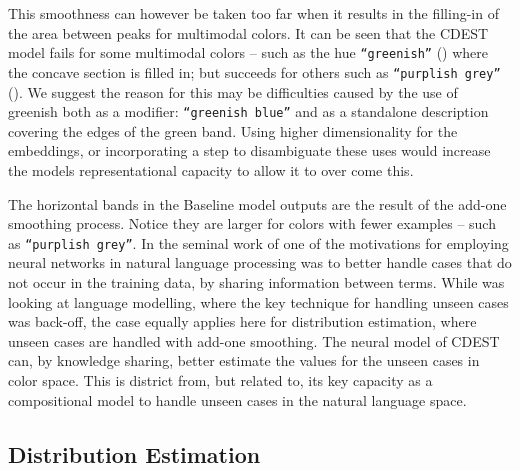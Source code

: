\documentclass[11pt,letterpaper, twocolumn]{article}
\newcommand{\textcite}{\cite}
\begin{document}
This smoothness can however be taken too far when it results in the filling-in of the area between peaks for multimodal colors.
It can be seen that the CDEST model fails for some multimodal colors -- such as the hue \texttt{``greenish''} () where the concave section is filled in;
but succeeds for others such as \texttt{``purplish grey''} ().
We suggest the reason for this may be difficulties caused by the use of greenish both as a modifier: \texttt{``greenish blue''} and as a standalone description covering the edges of the green band.
Using higher dimensionality for the embeddings, or incorporating a step to disambiguate these uses would increase the models representational capacity to allow it to over come this.


The horizontal bands in the Baseline model outputs are the result of the add-one smoothing process.
Notice they are larger for colors with fewer examples -- such as \texttt{``purplish grey''}.
In the seminal work of \textcite{NPLM} one of the motivations for employing neural networks in natural language processing was to better handle cases that do not occur in the training data, by sharing information between terms.
While \textcite{NPLM} was looking at language modelling, where the key technique for handling unseen cases was back-off, the case equally applies here for distribution estimation, where unseen cases are handled with add-one smoothing.
The neural model of CDEST can, by knowledge sharing, better estimate the values for the unseen cases in color space.
This is district from, but related to, its key capacity as a compositional model to handle unseen cases in the natural language space.
 


\subsection{Distribution Estimation}
\end{document}
